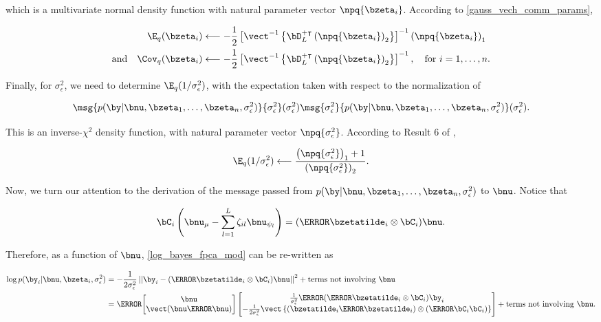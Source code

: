 \documentclass[12pt]{article}
\def\sigsqeps{\sigma^2_{\epsilon}}
\def\numu{\bnu_\mu}
\newcommand\nupsi[1]{\bnu_{\psi_{#1}}}
\newcommand\tni[1]{\text{terms not involving $#1$}}
\theoremstyle{plain}
\theoremstyle{definition}
\theoremstyle{remark}
\begin{document}
\noindent which is a multivariate normal density function with natural parameter vector $\npq{\bzeta_i}$.
According to \eqref{gauss_vech_comm_params},

\begin{align}
\begin{split}
	\E_q (\bzeta_i)
		&\longleftarrow
			-\frac12 \left[
				\vect^{-1} \left\{
					\bD_L^{+ \intercal}
					\left( \npq{\bzeta_i} \right)_2
				\right\}
			\right]^{-1} \left( \npq{\bzeta_i} \right)_1 \\
	\text{and} \quad
	\Cov_q (\bzeta_i)
		&\longleftarrow
			-\frac12 \left[
				\vect^{-1} \left\{
					\bD_L^{+ \intercal}
					\left( \npq{\bzeta_i} \right)_2
				\right\}
			\right]^{-1}, \quad \text{for $i = 1, \dots, n$.}
\end{split}
\label{exp_lik_zeta}
\end{align}

\noindent Finally, for $\sigsqeps$, we need to determine $\E_q (1/\sigsqeps)$, with the expectation taken with
respect to the normalization of

\[
	\msg{p (\by | \bnu, \bzeta_1, \dots, \bzeta_n, \sigsqeps)}{\sigsqeps} (\sigsqeps)
	\msg{\sigsqeps}{p (\by | \bnu, \bzeta_1, \dots, \bzeta_n, \sigsqeps)} (\sigsqeps).
\]

\noindent This is an inverse-$\chi^2$ density function, with natural parameter vector $\npq{\sigsqeps}$.
According to Result 6 of ,

\[
	\E_q (1/\sigsqeps)
		\longleftarrow
			\frac{
				\left( \npq{\sigsqeps} \right)_1 + 1
			}{
				\left( \npq{\sigsqeps} \right)_2
			}.
\]

Now, we turn our attention to the derivation of the message passed from $p (\by | \bnu, \bzeta_1, \dots, \bzeta_n,
\sigsqeps)$ to $\bnu$. Notice that

\begin{equation}
	\bC_i \left( \numu - \sum_{l=1}^L \zeta_{il} \nupsi{l} \right) = (\T{\bzetatilde_i} \otimes \bC_i) \bnu.
\label{theta_simplification}
\end{equation}

\noindent Therefore, as a function of $\bnu$, \eqref{log_bayes_fpca_mod} can be re-written as

\begin{align*}
	\log p (\by_i | \bnu, \bzeta_i, \sigsqeps)
		& = -\frac{1}{2\sigsqeps} \left|\left|
			\by_i - (\T{\bzetatilde_i} \otimes \bC_i) \bnu
		\right|\right|^2 + \tni{\bnu} \\
		& = \T{\begin{bmatrix}
			\bnu \\
			\vect (\bnu \T{\bnu})
		\end{bmatrix}} \begin{bmatrix}
			\frac{1}{\sigsqeps} \T{(\T{\bzetatilde_i} \otimes \bC_i)} \by_i \\
			-\frac{1}{2\sigsqeps} \vect \left\{
				(\bzetatilde_i \T{\bzetatilde_i}) \otimes (\T{\bC_i} \bC_i)
			\right\}
		\end{bmatrix} + \tni{\bnu}.
\end{align*}
\end{document}
